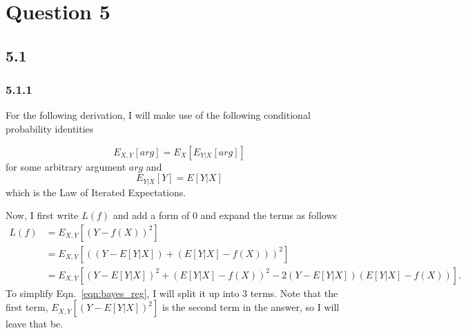 \documentclass[12pt]{amsart}
\begin{document}

\section*{Question 5}

\subsection*{5.1}

\subsubsection*{5.1.1}

For the following derivation, I will make use of the following conditional probability identities

\begin{equation} \label{eqn:exp_rule_1}
E_{X,Y}[arg] = E_{X}[E_{Y|X}[arg]]
\end{equation}
for some arbitrary argument $arg$ and 
\begin{equation} \label{eqn:exp_rule_2}
E_{Y|X}[Y] = E[Y|X]
\end{equation}
which is the Law of Iterated Expectations.

Now, I first write $L(f)$ and add a form of 0 and expand the terms as follows
\begin{equation} \label{eqn:bayes_reg}
\begin{split}
L(f) & = E_{X,Y}[(Y - f(X))^2] \\
& = E_{X,Y}[((Y - E[Y|X]) + (E[Y|X] - f(X)))^2] \\
& = E_{X,Y}[(Y - E[Y|X])^2 + (E[Y|X] - f(X))^2 - 2(Y - E[Y|X])(E[Y|X] - f(X))] .
\end{split}
\end{equation}
To simplify Eqn.~\ref{eqn:bayes_reg}, I will split it up into 3 terms.  Note that the first term, $E_{X,Y}[(Y - E[Y|X])^2]$ is the second term in the answer, so I will leave that be.  
\end{document}
